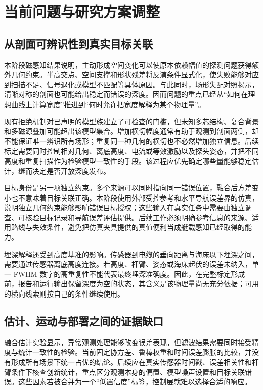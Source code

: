 \chapter{当前问题与研究方案调整}\label{chap:middle-discussion}
\section{从剖面可辨识性到真实目标关联}

本阶段磁感知结果说明，主动形成空间变化可以使原本依赖幅值的探测问题获得额外几何约束。半高交点、空间支撑和形状残差将反演条件显式化，使失败能够对应到扫描不足、信号退化或模型不匹配等具体原因。与此同时，场形失配对照揭示，清晰对称的剖面也可能给出稳定而错误的深度。因而问题的重点已经从“如何在理想曲线上计算宽度”推进到“何时允许把宽度解释为某个物理量”。

现有拒绝机制对已声明的模型族建立了可检查的门槛，但未知多芯结构、复合背景和多磁源叠加可能超出该模型集合。增加横切幅度通常有助于观测到剖面两侧，却不能保证唯一辨识所有场形；重复同一种几何的横切也不必然增加独立信息。后续标定需要同时控制相对几何、离底高度、电流或等效激励以及探头姿态，并把不同高度和重复扫描作为检验模型一致性的手段。该过程应优先确定哪些量能够稳定估计，继而决定是否开放深度发布。

目标身份是另一项独立约束。多个来源可以同时指向同一错误位置，融合后方差变小也不意味着目标关联正确。本阶段使用外部受控参考和水平导航误差界的仿真，说明独立几何约束能够影响错误目标授权；这些输入在真实任务中需要由独立调查、可核验目标记录和导航误差评估提供。后续工作必须明确参考信息的来源、适用路线与失效条件，避免把仿真夹具提供的真值便利当成艇载感知已经取得的能力。

埋深解释还受到高度基准的影响。传感器到电缆的垂向距离与海床以下埋深之间，需要通过传感器离底高度连接。若高度、杆臂、姿态或海床起伏的误差未纳入，单一 FWHM 数字的高重复性不能代表最终埋深准确度。因此，在完整标定形成前，报告和运行输出保留深度为空的状态，其含义是该物理量尚无充分依据；可用的横向线索则按自己的条件继续使用。

\section{估计、运动与部署之间的证据缺口}

融合估计实验显示，异常观测处理能够改变误差表现，但滤波结果需要同时接受精度与统计一致性的检验。当前固定协方差、鲁棒权重和时间误差膨胀的比较，并没有形成所有场景下统一占优的结论。后续应在真实传感器时间戳、误差相关性和杆臂条件下核查创新统计，重点区分观测本身的偏置、模型噪声设置和目标关联错误。这些因素若被合并为一个“低置信度”标签，控制层就难以选择合适的响应。

